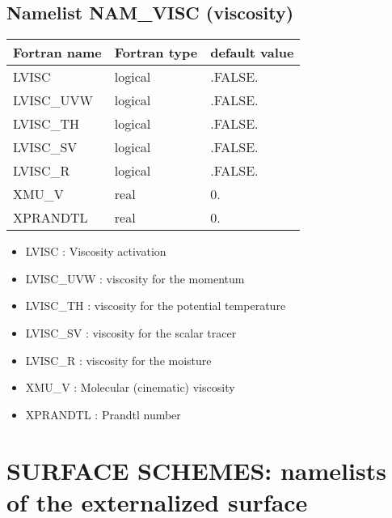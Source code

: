 \subsection{Namelist NAM\_VISC (viscosity)}
\begin{center}
\begin{tabular}{|l|l|l| }
\hline 
 Fortran name  & Fortran type  & default value \\
\hline
 LVISC & logical       & .FALSE.           \\
 LVISC\_UVW & logical       & .FALSE.           \\
 LVISC\_TH & logical       & .FALSE.           \\
 LVISC\_SV & logical       & .FALSE.           \\
 LVISC\_R & logical       & .FALSE.           \\
 XMU\_V & real       & 0.           \\
 XPRANDTL & real       & 0.           \\
\hline
\end{tabular}
\end{center}

\begin{itemize}
\item   {}
LVISC : Viscosity activation

\item   {}
LVISC\_UVW : viscosity for the momentum

\item   {}
LVISC\_TH : viscosity for the potential temperature

\item   {}
LVISC\_SV : viscosity for the scalar tracer

\item   {}
LVISC\_R : viscosity for the moisture
 
\item   {}
XMU\_V : Molecular (cinematic) viscosity

\item   {}
XPRANDTL : Prandtl number

\end{itemize}

\section{SURFACE SCHEMES: namelists of the externalized surface}
\label{ss:surf}

